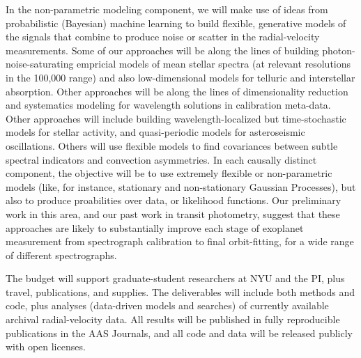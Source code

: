 \documentclass[12pt, fullpage, letterpaper]{article}
\begin{document}
In the non-parametric modeling component, we will make use of ideas
from probabilistic (Bayesian) machine learning to build flexible,
generative models of the signals that combine to produce noise or
scatter in the radial-velocity measurements. Some of our approaches
will be along the lines of building photon-noise-saturating empricial
models of mean stellar spectra (at relevant resolutions in the 100,000
range) and also low-dimensional models for telluric and interstellar
absorption. Other approaches will be along the lines of dimensionality
reduction and systematics modeling for wavelength solutions in
calibration meta-data. Other approaches will include building
wavelength-localized but time-stochastic models for stellar activity,
and quasi-periodic models for asteroseismic oscillations. Others will
use flexible models to find covariances between subtle spectral
indicators and convection asymmetries. In each causally distinct
component, the objective will be to use extremely flexible or
non-parametric models (like, for instance, stationary and
non-stationary Gaussian Processes), but also to produce proabilities
over data, or likelihood functions.  Our preliminary work in this
area, and our past work in transit photometry, suggest that these
approaches are likely to substantially improve each stage of exoplanet
measurement from spectrograph calibration to final orbit-fitting, for
a wide range of different spectrographs.

The budget will support graduate-student researchers at NYU and the
PI, plus travel, publications, and supplies. The deliverables will
include both methods and code, plus analyses (data-driven models and
searches) of currently available archival radial-velocity data. All
results will be published in fully reproducible publications in the
AAS Journals, and all code and data will be released publicly with
open licenses.
\end{document}
